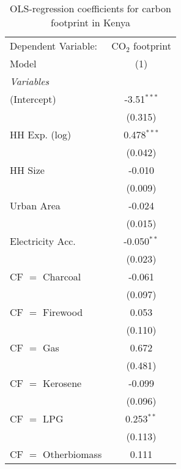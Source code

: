 
\begin{table}[htbp!]
   \centering
   \small
   \begin{adjustbox}{width = 1\textwidth, max height = 0.95\textheight, center}
      \begin{threeparttable}[b]
         \caption{\label{tab:OLS_2_KEN} OLS-regression coefficients for carbon footprint in Kenya}
         \begin{tabular}{lc}
            \tabularnewline \midrule \midrule
            Dependent Variable: & CO$_{2}$ footprint\\  
            Model               & (1)\\  
            \midrule
            \emph{Variables}\\
            (Intercept)         & -3.51$^{***}$\\   
                                & (0.315)\\   
            HH Exp. (log)       & 0.478$^{***}$\\   
                                & (0.042)\\   
            HH Size             & -0.010\\   
                                & (0.009)\\   
            Urban Area          & -0.024\\   
                                & (0.015)\\   
            Electricity Acc.    & -0.050$^{**}$\\   
                                & (0.023)\\   
            CF $=$ Charcoal     & -0.061\\   
                                & (0.097)\\   
            CF $=$ Firewood     & 0.053\\   
                                & (0.110)\\   
            CF $=$ Gas          & 0.672\\   
                                & (0.481)\\   
            CF $=$ Kerosene     & -0.099\\   
                                & (0.096)\\   
            CF $=$ LPG          & 0.253$^{**}$\\   
                                & (0.113)\\   
            CF $=$ Otherbiomass & 0.111\\   

\end{tabular}
\end{threeparttable}
\end{adjustbox}
\end{table}
